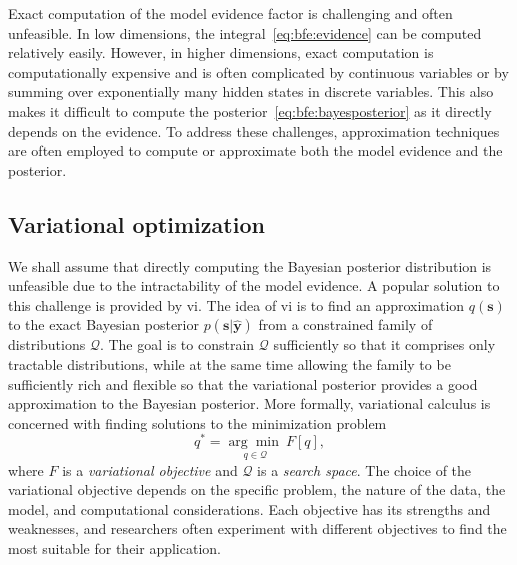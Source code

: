 Exact computation of the model evidence factor is challenging and often unfeasible.
In low dimensions, the integral~\eqref{eq:bfe:evidence} can be computed relatively easily. However, in higher dimensions, exact computation is computationally expensive and is often complicated by continuous variables or by summing over exponentially many hidden states in discrete variables. This also makes it difficult to compute the posterior~\eqref{eq:bfe:bayesposterior} as it directly depends on the evidence. To address these challenges, approximation techniques are often employed to compute or approximate both the model evidence and the posterior.

\subsection{Variational optimization}\label{sec:variational-optimization}

We shall assume that directly computing the Bayesian posterior distribution is unfeasible due to the intractability of the model evidence. 
A popular solution to this challenge is provided by \acf{vi}.
The idea of \ac{vi} is to find an approximation $q(\bm{s})$ to the exact Bayesian posterior $p(\bm{s}\vert \hat{\bm{y}})$ from a constrained family of distributions $\mathcal{Q}$. 
The goal is to constrain $\mathcal{Q}$ sufficiently so that it comprises only tractable distributions, while at the same time allowing the family to be sufficiently rich and flexible so that the variational posterior provides a good approximation to the Bayesian posterior.
More formally, variational calculus is concerned with finding solutions to the minimization problem 
\begin{equation}
    \label{eq:bfe:vi}
    q^{*} = \underset{q \in \mathcal{Q}}{\arg\min~}F[q],
\end{equation}
where $F$ is a \textit{variational objective} and $\mathcal{Q}$ is a \textit{search space}.
The choice of the variational objective depends on the specific problem, the nature of the data, 
the model, and computational considerations.
Each objective has its strengths and weaknesses, and researchers often experiment with
different objectives to find the most suitable for their application.


